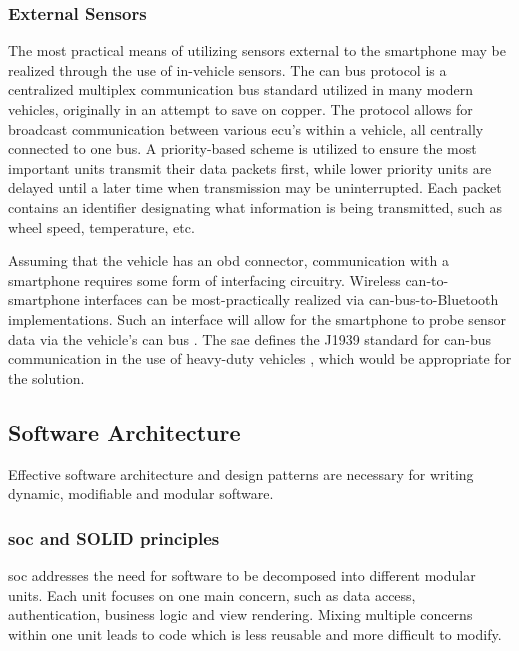 \subsubsection{External Sensors}
The most practical means of utilizing sensors external to the smartphone may be realized through the use of in-vehicle sensors. 
The \ac{can} bus protocol is a centralized multiplex communication bus standard utilized in many modern vehicles, originally in an attempt to save on copper. 
The protocol allows for broadcast communication between various \ac{ecu}'s within a vehicle, all centrally connected to one bus.
A priority-based scheme is utilized to ensure the most important units transmit their data packets first, while lower priority units are delayed until a later time when transmission may be uninterrupted. Each packet contains an identifier designating what information is being transmitted, such as wheel speed, temperature, etc.
\cite{van2011canauth}

Assuming that the vehicle has an \ac{obd} connector, communication with a smartphone requires some form of interfacing circuitry.
Wireless \ac{can}-to-smartphone interfaces can be most-practically realized via \ac{can}-bus-to-Bluetooth implementations.
Such an interface will allow for the smartphone to probe sensor data via the vehicle's \ac{can} bus \cite{campolo2012smartcar} \cite{walter2013smartphone}.
The \ac{sae} defines the J1939 standard for \ac{can}-bus communication in the use of heavy-duty vehicles \cite{stepper1993j1939}, which would be appropriate for the solution.

\subsection{Software Architecture}
Effective software architecture and design patterns are necessary for writing dynamic, modifiable and modular software.

\subsubsection{\ac{soc} and SOLID principles}
\Ac{soc} addresses the need for software to be decomposed into different modular units.
Each unit focuses on one main concern, such as data access, authentication, business logic and view rendering.
Mixing multiple concerns within one unit leads to code which is less reusable and more difficult to modify.
\cite{gamageseparation}


